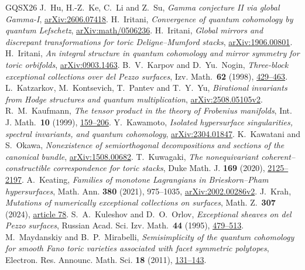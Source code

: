 \begin{thebibliography}{GQSX26}
 J.~Hu, H.-Z.~Ke, C.~Li and Z.~Su, \emph{Gamma conjecture II via global Gamma-I}, \href{https://arxiv.org/abs/2606.07418}{arXiv:2606.07418}.
 H.~Iritani, \emph{Convergence of quantum cohomology by quantum Lefschetz}, \href{https://arxiv.org/abs/math/0506236}{arXiv:math/0506236}.
 H.~Iritani, \emph{Global mirrors and discrepant transformations for toric Deligne--Mumford stacks}, \href{https://arxiv.org/abs/1906.00801}{arXiv:1906.00801}.
 H.~Iritani, \emph{An integral structure in quantum cohomology and mirror symmetry for toric orbifolds}, \href{https://arxiv.org/abs/0903.1463}{arXiv:0903.1463}.
 B.~V.~Karpov and D.~Yu.~Nogin, \emph{Three-block exceptional collections over del Pezzo surfaces}, Izv. Math.\ \textbf{62} (1998), \href{https://doi.org/10.1070/IM1998v062n03ABEH000205}{429--463}.
 L.~Katzarkov, M.~Kontsevich, T.~Pantev and T.~Y.~Yu, \emph{Birational invariants from Hodge structures and quantum multiplication}, \href{https://arxiv.org/abs/2508.05105v2}{arXiv:2508.05105v2}.
 R.~M.~Kaufmann, \emph{The tensor product in the theory of Frobenius manifolds}, Int. J. Math.\ \textbf{10} (1999), \href{https://arxiv.org/abs/math/9806082}{159--206}.
 Y.~Kawamoto, \emph{Isolated hypersurface singularities, spectral invariants, and quantum cohomology}, \href{https://arxiv.org/abs/2304.01847}{arXiv:2304.01847}.
 K.~Kawatani and S.~Okawa, \emph{Nonexistence of semiorthogonal decompositions and sections of the canonical bundle}, \href{https://arxiv.org/abs/1508.00682}{arXiv:1508.00682}.
 T.~Kuwagaki, \emph{The nonequivariant coherent--constructible correspondence for toric stacks}, Duke Math. J. \textbf{169} (2020), \href{https://arxiv.org/abs/1610.03214v4}{2125--2197}.
 A.~Keating, \emph{Families of monotone Lagrangians in Brieskorn--Pham hypersurfaces}, Math. Ann. \textbf{380} (2021), 975--1035, \href{https://arxiv.org/abs/2002.00286v2}{arXiv:2002.00286v2}.
 J.~Krah, \emph{Mutations of numerically exceptional collections on surfaces}, Math. Z.\ \textbf{307} (2024), \href{https://doi.org/10.1007/s00209-024-03550-4}{article 78}.
 S.~A.~Kuleshov and D.~O.~Orlov, \emph{Exceptional sheaves on del Pezzo surfaces}, Russian Acad. Sci. Izv. Math.\ \textbf{44} (1995), \href{https://homepage.mi-ras.ru/~orlov/papers/1994_Izv_Math.pdf}{479--513}.
 M.~Maydanskiy and B.~P.~Mirabelli, \emph{Semisimplicity of the quantum cohomology for smooth Fano toric varieties associated with facet symmetric polytopes}, Electron. Res. Announc. Math. Sci. \textbf{18} (2011), \href{https://doi.org/10.3934/era.2011.18.131}{131--143}.

\end{thebibliography}
